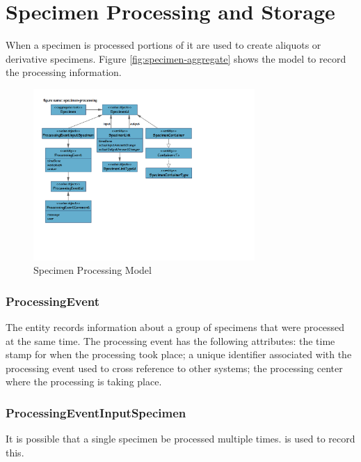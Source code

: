 \chapter{Specimen Processing and Storage}
\label{chap:specimen-processing}

When a specimen is processed portions of it are used to create aliquots or
derivative specimens. Figure \ref{fig:specimen-aggregate} shows the model to
record the processing information.

\begin{figure}[H]
  \centering
  \includegraphics[trim={10mm 42mm 78mm 18mm}, clip,
    width=0.75\textwidth]{images/specimen-processing}
  \caption{Specimen Processing Model}
  \label{fig:specimen-processing}
\end{figure}

\subsection*{ProcessingEvent}
The  entity records information about a group of
specimens that were processed at the same time. The processing event has the
following attributes:  the time stamp for when the
processing took place;  a unique identifier associated with
the processing event used to cross reference to other systems;
 the processing center where the processing is taking place.

\subsection*{ProcessingEventInputSpecimen}
It is possible that a single specimen be processed multiple
times.  is used to record this.

